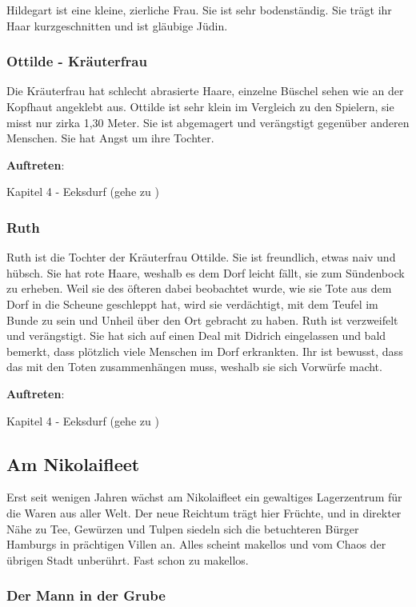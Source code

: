 Hildegart ist eine kleine, zierliche Frau. Sie ist sehr bodenständig. Sie trägt ihr Haar kurzgeschnitten und ist gläubige Jüdin.

\subsubsection*{Ottilde - Kräuterfrau}
\label{Ottilde}

Die Kräuterfrau hat schlecht abrasierte Haare, einzelne Büschel sehen wie an der Kopfhaut angeklebt aus. Ottilde ist sehr klein im Vergleich zu den Spielern, sie misst nur zirka 1,30 Meter. Sie ist abgemagert und verängstigt gegenüber anderen Menschen. Sie hat Angst um ihre Tochter.

\textbf{Auftreten}:

Kapitel 4 - Eeksdurf (gehe zu \blue{\ref{inxd}})

\subsubsection*{Ruth}
\label{Ruth}

Ruth ist die Tochter der Kräuterfrau Ottilde. Sie ist freundlich, etwas naiv und hübsch. Sie hat rote Haare, weshalb es dem Dorf leicht fällt, sie zum Sündenbock zu erheben. Weil sie des öfteren dabei beobachtet wurde, wie sie Tote aus dem Dorf in die Scheune geschleppt hat, wird sie verdächtigt, mit dem Teufel im Bunde zu sein und Unheil über den Ort gebracht zu haben. Ruth ist verzweifelt und verängstigt. Sie hat sich auf einen Deal mit Didrich eingelassen und bald bemerkt, dass plötzlich viele Menschen im Dorf erkrankten. Ihr ist bewusst, dass das mit den Toten zusammenhängen muss, weshalb sie sich Vorwürfe macht.

\textbf{Auftreten}:

Kapitel 4 - Eeksdurf (gehe zu \blue{\ref{inxd}})

\subsection{Am Nikolaifleet}

Erst seit wenigen Jahren wächst am Nikolaifleet ein gewaltiges Lagerzentrum für die Waren aus aller Welt. Der neue Reichtum trägt hier Früchte, und in direkter Nähe zu Tee, Gewürzen und Tulpen siedeln sich die betuchteren Bürger Hamburgs in prächtigen Villen an. Alles scheint makellos und vom Chaos der übrigen Stadt unberührt. Fast schon zu makellos.

\subsubsection*{Der Mann in der Grube}
\label{Grubenmann}

